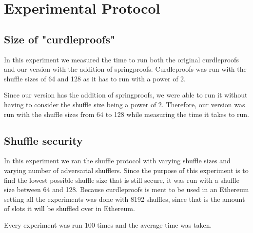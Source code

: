 
\section{Experimental Protocol}\label{sec:experimental-protocol}



\subsection{Size of "curdleproofs"}\label{sec:experimental-protocol-size}
In this experiment we measured the time to run both the original curdleproofs and our version with the addition of springproofs.
Curdleproofs was run with the shuffle sizes of 64 and 128 as it has to run with a power of 2.

Since our version has the addition of springproofs, we were able to run it without having to consider the shuffle size being a power of 2.
Therefore, our version was run with the shuffle sizes from 64 to 128 while measuring the time it takes to run.



\subsection{Shuffle security}\label{sec:experimental-protocol-shuffle-security}
In this experiment we ran the shuffle protocol with varying shuffle sizes and varying number of adversarial shufflers.
Since the purpose of this experiment is to find the lowest possible shuffle size that is still secure, it was run with a shuffle size between 64 and 128.
Because curdleproofs is ment to be used in an Ethereum setting all the experiments was done with 8192 shuffles, since that is the amount of slots it will be shuffled over in Ethereum.

Every experiment was run 100 times and the average time was taken.

